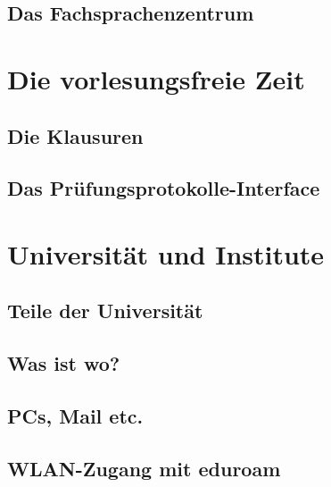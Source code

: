 \documentclass[12pt, a4paper]{article}
\newif\ifinfo
\begin{document}
\subsection{Das Fachsprachenzentrum}


\pagebreak
\section{Die vorlesungsfreie Zeit}
\subsection{Die Klausuren}
\ifinfo
	
\else
	
\fi 

\subsection{Das Prüfungsprotokolle-Interface}

\ifinfo
\else
	\vfill
\fi 

\ifinfo
	\subsection{Praktika}
	
\fi 

\pagebreak

\section{Universität und Institute}
\subsection{Teile der Universität}
\ifinfo
	
\else
	
\fi 

\subsection{Was ist wo?}
\ifinfo
	
\else
	
\fi 

\pagebreak
\subsection{PCs, Mail etc.}
	 
\subsection{WLAN-Zugang mit eduroam}
	
\end{document}
